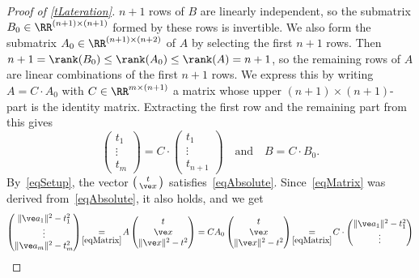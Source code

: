 \documentclass[reqno]{amsart}
\begin{document}
\begin{proof}[Proof of \cref{tLateration}]
  $n + 1$ rows of $B$ are linearly independent, so the
  submatrix $B_0 \in \RR^{(n+1) \times (n+1)}$ formed by these
  rows is invertible. We also form the submatrix
  $A_0 \in \RR^{(n+1) \times (n+2)}$ of $A$ by selecting the first
  $n+1$ rows. Then
  $n+1 = \rank(B_0) \le \rank(A_0) \le \rank(A) = n+1$, so the
  remaining rows of $A$ are linear combinations of the first $n+1$
  rows. We express this by writing $A = C \cdot A_0$ with
  $C \in \RR^{m \times (n+1)}$ a matrix whose upper
  $(n+1) \times (n+1)$-part is the identity matrix. Extracting the
  first row and the remaining part from this gives
  \begin{equation} \label{eqACA}%
    \begin{pmatrix}
      t_1 \\ \vdots \\ t_m
    \end{pmatrix} = C \cdot
    \begin{pmatrix}
      t_1 \\ \vdots \\ t_{n+1}
    \end{pmatrix} \quad \text{and} \quad B = C \cdot B_0.
  \end{equation}
  By~\eqref{eqSetup}, the vector
  $\left(\begin{smallmatrix} t \\ \ve x\end{smallmatrix}\right)$
  satisfies~\eqref{eqAbsolute}. Since~\eqref{eqMatrix} was derived
  from~\eqref{eqAbsolute}, it also holds, and we get
  \begin{equation} \label{eqAtC}%
    \begin{pmatrix} \lVert\ve a_1\rVert^2 - t_1^2 \\ \vdots \\
      \lVert\ve a_m\rVert^2 - t_m^2
    \end{pmatrix} \!\underset{\eqref{eqMatrix}}{=}\! A
    \begin{pmatrix} t \\ \ve x \\ \lVert\ve x\rVert^2 - t^2
    \end{pmatrix} = C A_0
    \begin{pmatrix} t \\ \ve x \\ \lVert\ve x\rVert^2 - t^2
    \end{pmatrix} \!\underset{\eqref{eqMatrix}}{=}\! C \cdot
    \begin{pmatrix} \lVert\ve a_1\rVert^2 - t_1^2 \\ \vdots \\

\end{pmatrix}
\end{equation}
\end{proof}
\end{document}
